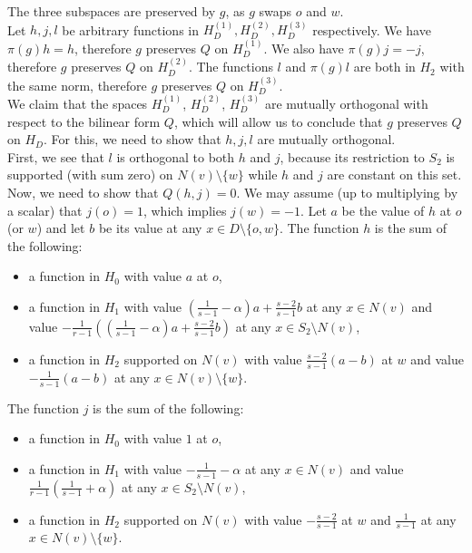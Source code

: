 \documentclass{article}
\theoremstyle{definition}
\theoremstyle{remark}
\theoremstyle{plain}
\begin{document}
The three subspaces are preserved by $g$, as $g$ swaps $o$ and $w$. \\

Let $h,j,l$ be arbitrary functions in $H_D^{(1)},H_D^{(2)},H_D^{(3)}$ respectively. We have $\pi(g)h=h$, therefore $g$ preserves $Q$ on $H_D^{(1)}$. We also have $\pi(g)j=-j$, therefore $g$ preserves $Q$ on $H_D^{(2)}$. The functions $l$ and $\pi(g)l$ are both in $H_2$ with the same norm, therefore $g$ preserves $Q$ on $H_D^{(3)}$. \\

We claim that the spaces $H_D^{(1)}$, $H_D^{(2)}$, $H_D^{(3)}$ are mutually orthogonal with respect to the bilinear form $Q$, which will allow us to conclude that $g$ preserves $Q$ on $H_D$. For this, we need to show that $h,j,l$ are mutually orthogonal. \\

First, we see that $l$ is orthogonal to both $h$ and $j$, because its restriction to $S_2$ is supported (with sum zero) on $N(v)\setminus\{w\}$ while $h$ and $j$ are constant on this set.\\

Now, we need to show that $Q(h,j)=0$. We may assume (up to multiplying by a scalar) that $j(o)=1$, which implies $j(w)=-1$. Let $a$ be the value of $h$ at $o$ (or $w$) and let $b$ be its value at any $x\in D\setminus\{o,w\}$. The function $h$ is the sum of the following:

\begin{itemize}
    \item a function in $H_0$ with value $a$ at $o$,
    \item a function in $H_1$ with value $\left(\frac{1}{s-1}-\alpha\right)a+\frac{s-2}{s-1}b$ at any $x\in N(v)$ and value $-\frac{1}{r-1}\left(\left(\frac{1}{s-1}-\alpha\right)a+\frac{s-2}{s-1}b\right)$ at any $x\in S_2\setminus N(v)$,
    \item a function in $H_2$ supported on $N(v)$ with value $\frac{s-2}{s-1}(a-b)$ at $w$ and value $-\frac{1}{s-1}(a-b)$ at any $x\in N(v)\setminus\{w\}$. \\
\end{itemize}

The function $j$ is the sum of the following:

\begin{itemize}
    \item a function in $H_0$ with value $1$ at $o$,
    \item a function in $H_1$ with value $-\frac{1}{s-1}-\alpha$ at any $x\in N(v)$ and value $\frac{1}{r-1}\left(\frac{1}{s-1}+\alpha\right)$ at any $x\in S_2\setminus N(v)$,
    \item a function in $H_2$ supported on $N(v)$ with value $-\frac{s-2}{s-1}$ at $w$ and $\frac{1}{s-1}$ at any $x\in N(v)\setminus\{w\}$. \\
\end{itemize}
\end{document}

